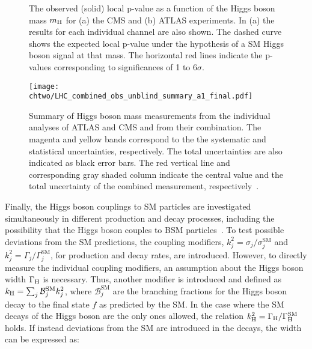   \begin{figure}[!htb]
  \centering
  \caption{The observed (solid) local p-value as a function of the Higgs boson mass $m_\mathrm{H}$ for (a) the CMS and (b) ATLAS experiments. In (a) the results for each individual channel are also shown. 
  The dashed curve shows the expected local p-value under the hypothesis of a SM Higgs boson signal at that mass.
  The horizontal red lines indicate the p-values corresponding to significances of 1 to 6$\sigma$.}
  \label{fig:HiggsPvalue}
\end{figure} 

  \begin{figure}[!htb]
  \centering
  \texttt{[image: \\chtwo/LHC\_combined\_obs\_unblind\_summary\_a1\_final.pdf]}
  \caption{Summary of Higgs boson mass measurements from the individual analyses of ATLAS and CMS and from their combination.
  The magenta and yellow bands correspond to the the systematic and statistical uncertainties, respectively. The total uncertainties are also indicated as black error bars.
  The red vertical line and corresponding gray shaded column indicate the central value and the total uncertainty of the combined measurement, respectively~\cite{Aad:2015zhl}.}
  \label{fig:HiggsMass}
\end{figure} 

Finally, the Higgs boson couplings to SM particles are investigated simultaneously in different production and decay processes, including the possibility that the Higgs boson couples to BSM particles~\cite{Khachatryan:2016vau}.
To test possible deviations from the SM predictions, the coupling modifiers, $k^2_j = \sigma_j/\sigma^\mathrm{SM}_j$ and $k^2_j = \Gamma_j/\Gamma^\mathrm{SM}_j$, for production and decay rates, are introduced. 
However, to directly measure the individual coupling modifiers, an assumption about the Higgs boson width $\Gamma_\mathrm{H}$ is necessary. Thus, another modifier is introduced and defined as $k_\mathrm{H} = \sum_j \mathcal{B}^\mathrm{SM}_jk^2_j$, where $\mathcal{B}^\mathrm{SM}_j$ are the branching fractions for the Higgs boson decay to the final state $f$ as predicted by the SM. In the case where the SM decays of the Higgs boson are the only ones allowed,
the relation $k^2_\mathrm{H} = \Gamma_\mathrm{H}/\Gamma^\mathrm{SM}_\mathrm{H}$ holds. If instead deviations from the SM are introduced in the decays, the width can be expressed as:

